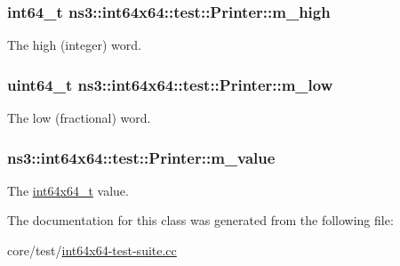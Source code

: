 \subsubsection[{\texorpdfstring{m\+\_\+high}{m_high}}]{\setlength{\rightskip}{0pt plus 5cm}int64\+\_\+t ns3\+::int64x64\+::test\+::\+Printer\+::m\+\_\+high\hspace{0.3cm}{\ttfamily [private]}}\hypertarget{classns3_1_1int64x64_1_1test_1_1Printer_a73c042edda613cf91f22e0c76ccc0bfe}{}\label{classns3_1_1int64x64_1_1test_1_1Printer_a73c042edda613cf91f22e0c76ccc0bfe}
The high (integer) word. 
\subsubsection[{\texorpdfstring{m\+\_\+low}{m_low}}]{\setlength{\rightskip}{0pt plus 5cm}uint64\+\_\+t ns3\+::int64x64\+::test\+::\+Printer\+::m\+\_\+low\hspace{0.3cm}{\ttfamily [private]}}\hypertarget{classns3_1_1int64x64_1_1test_1_1Printer_abc8124eb64bf1309dd8e80c04ff44485}{}\label{classns3_1_1int64x64_1_1test_1_1Printer_abc8124eb64bf1309dd8e80c04ff44485}
The low (fractional) word. 
\subsubsection[{\texorpdfstring{m\+\_\+value}{m_value}}]{ ns3\+::int64x64\+::test\+::\+Printer\+::m\+\_\+value\hspace{0.3cm}{\ttfamily [private]}}\hypertarget{classns3_1_1int64x64_1_1test_1_1Printer_a0d040cf4df463b1161d19a185f7930a9}{}\label{classns3_1_1int64x64_1_1test_1_1Printer_a0d040cf4df463b1161d19a185f7930a9}
The \hyperlink{classint64x64__t}{int64x64\+\_\+t} value. 

The documentation for this class was generated from the following file\+:\begin{DoxyCompactItemize}
\item 
core/test/\hyperlink{int64x64-test-suite_8cc}{int64x64-\/test-\/suite.\+cc}\end{DoxyCompactItemize}
